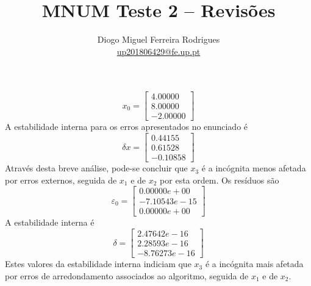 \documentclass{mnum}
\title{MNUM Teste 2 -- Revisões}
\author{Diogo Miguel Ferreira Rodrigues \\ \href{mailto:up201806429@fe.up.pt}{up201806429@fe.up.pt}}
\begin{document}
\setcounter{chapter}{0}

%
\begin{equation*}
	x_0 = \begin{bmatrix}
		4.00000 \\
		8.00000 \\
		-2.00000
	\end{bmatrix}
\end{equation*}
A estabilidade interna para os erros apresentados no enunciado é
\begin{equation*}
	\delta x = \begin{bmatrix}
		0.44155 \\
		0.61528 \\
		-0.10858
	\end{bmatrix}
\end{equation*}
Através desta breve análise, pode-se concluir que $x_3$ é a incógnita menos afetada por erros externos, seguida de $x_1$ e de $x_2$ por esta ordem.
Os resíduos são
\begin{equation*}
	\varepsilon _0 = \begin{bmatrix}
		0.00000e+00 \\
		-7.10543e-15 \\
		0.00000e+00
	\end{bmatrix}
\end{equation*}
A estabilidade interna é
\begin{equation*}
	\delta = \begin{bmatrix}
		2.47642e-16 \\
		2.28593e-16 \\
		-8.76273e-16
	\end{bmatrix}
\end{equation*}
Estes valores da estabilidade interna indiciam que $x_3$ é a incógnita mais afetada por erros de arredondamento associados ao algoritmo, seguida de $x_1$ e de $x_2$.
\end{document}
